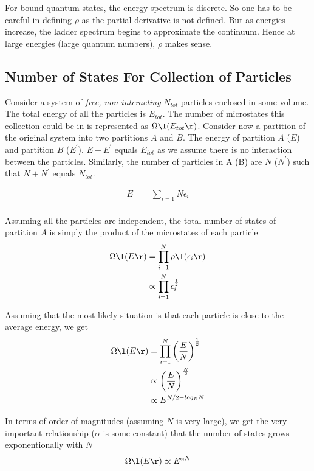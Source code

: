 \documentclass[12pt]{article}
\begin{document}
For bound quantum states, the energy spectrum is discrete. So one has to be
careful in defining $\rho$ as the partial derivative is not defined. But as
energies increase, the ladder spectrum begins to approximate the continuum. Hence
at large energies (large quantum numbers), $\rho$ makes sense.


\subsection{Number of States For Collection of Particles}

Consider a system of {\em free, non interacting} $N_{tot}$ particles enclosed in
some volume. The total energy of all the particles is $E_{tot}$. The number of 
microstates this collection could be in is represented as $\Omega\l( E_{tot}\r)$.
Consider now a partition of the original system into two partitions $A$ and $B$.
The energy of partition $A$ ($E$) and partition $B$ ($E^\prime$). $E + E^\prime$
equals $E_{tot}$ as we assume there is no interaction between the particles. 
Similarly, the number of particles in A (B) are $N$ ($N^\prime$) such that
$N + N^\prime$ equals $N_{tot}$.

\begin{equation*}
\begin{split}
E & = \sum_{i=1}{N}\epsilon_i \\
\end{split}
\end{equation*}

Assuming all the particles are independent, the total number of states of partition
$A$ is simply the product of the microstates of each particle
\begin{equation*}
\begin{split}
\Omega\l ( E \r) & = \prod_{i=1}^{N}\rho \l( \epsilon_i \r) \\
& \propto \prod_{i=1}^{N} \epsilon_i^\frac{1}{2}
\end{split}
\end{equation*} 

Assuming that the most likely situation is that each particle is close to the 
average energy, we get
\begin{equation*}
\begin{split}
\Omega\l ( E \r) & = \prod_{i=1}^{N}\left(\frac{E}{N}\right)^\frac{1}{2} \\
& \propto \left(\frac{E}{N}\right)^\frac{N}{2} \\
& \propto E^{N/2 -log_E{N}}
\end{split}
\end{equation*}

In terms of order of magnitudes (assuming $N$ is very large), we get the very 
important relationship ($\alpha$ is some constant) that the number of states
grows exponentionally with $N$
\begin{equation}
\begin{split}
\Omega\l ( E \r) & \propto E^{\alpha N} \\
\end{split}
\end{equation}
\end{document}
